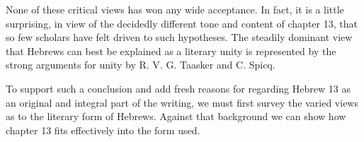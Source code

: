 None of these critical views has won any wide acceptance.
In fact, it is a little surprising, in view of the decidedly different tone and
content of chapter 13, that so few scholars have felt driven to such hypotheses.
The steadily dominant view that Hebrews can best be explained as a literary
unity is represented by the strong arguments for unity by R. V. G. Taasker and
C. Spicq.
\newline

To support such a conclusion and add fresh reasons for regarding Hebrew 13 as an
original and integral part of the writing, we must first survey the varied views
as to the literary form of Hebrews.
Against that background we can show how chapter 13 fits effectively into the
form used.

